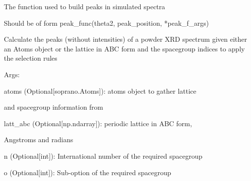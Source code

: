 \documentclass[letterpaper,10pt,english]{sphinxmanual}
\begin{document}
\begin{fulllineitems}
\begin{fulllineitems}
\end{fulllineitems}


\begin{fulllineitems}
\label{doctree/soprano.calculate.xrd.xrd:soprano.calculate.xrd.xrd.XRDCalculator.peak_func}
The function used to build peaks in simulated spectra

Should be of form peak\_func(theta2, peak\_position, *peak\_f\_args)

\end{fulllineitems}


\begin{fulllineitems}
\label{doctree/soprano.calculate.xrd.xrd:soprano.calculate.xrd.xrd.XRDCalculator.powder_peaks}
Calculate the peaks (without intensities) of a powder
XRD spectrum given either an Atoms object or the lattice in ABC form
and the spacegroup indices to apply the selection rules

\begin{DUlineblock}{0em}
\item[] Args:
\item[]
\begin{DUlineblock}{\DUlineblockindent}
\item[]
\begin{DUlineblock}{\DUlineblockindent}
\item[] atoms (Optional{[}soprano.Atoms{]}): atoms object to gather lattice
\item[]
\begin{DUlineblock}{\DUlineblockindent}
\item[] and spacegroup information from
\end{DUlineblock}
\item[] latt\_abc (Optional{[}np.ndarray{]}): periodic lattice in ABC form,
\item[]
\begin{DUlineblock}{\DUlineblockindent}
\item[] Angstroms and radians
\end{DUlineblock}
\end{DUlineblock}
\item[] n (Optional{[}int{]}): International number of the required spacegroup
\item[] o (Optional{[}int{]}): Sub-option of the required spacegroup
\end{DUlineblock}
\end{DUlineblock}


\end{fulllineitems}
\end{fulllineitems}
\end{document}
